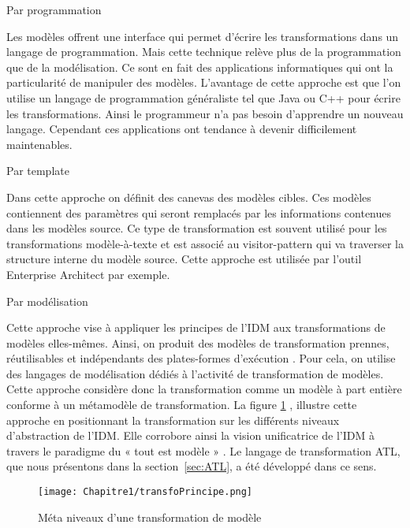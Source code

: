 \begin{bulletList}
\item Par programmation

Les modèles offrent une interface qui permet d'écrire les transformations dans un langage de programmation. Mais cette technique relève plus de la programmation que de la modélisation. Ce sont en fait des applications informatiques qui ont la particularité de manipuler des modèles. L'avantage de cette approche est que l'on utilise un langage de programmation généraliste tel que Java ou C++ pour écrire les transformations. Ainsi le programmeur n'a pas besoin d'apprendre un nouveau langage. Cependant ces applications ont tendance à devenir difficilement maintenables. 

\item Par template 

Dans cette approche on définit des canevas des modèles cibles. Ces modèles contiennent des paramètres qui seront remplacés par les informations contenues dans les modèles source. Ce type de transformation est souvent utilisé pour les transformations modèle-à-texte et est associé au visitor-pattern qui va traverser la structure interne du modèle source. Cette approche est utilisée par l'outil Enterprise Architect par exemple. 

\item Par modélisation

Cette approche vise à appliquer les principes de l'IDM aux transformations de modèles elles-mêmes. Ainsi, on produit des modèles de transformation prennes, réutilisables et indépendants des plates-formes d'exécution \cite{bezivin2006model}. Pour cela, on utilise des langages de modélisation dédiés à l'activité de transformation de modèles. Cette approche considère donc la transformation comme un modèle à part entière conforme à un métamodèle de transformation. La figure \ref{fig:TransfoPrincipe} , illustre cette approche en positionnant la transformation sur les différents niveaux d'abstraction de l'IDM. Elle corrobore ainsi la vision unificatrice de l'IDM à travers le paradigme du « tout est modèle » \cite{bezivin2005unification}. Le langage de transformation ATL, que nous présentons dans la section~\ref{sec:ATL}, a été développé dans ce sens. 

\end{bulletList}

\begin{figure}[!htbp]
 \begin{center}
  \texttt{[image: Chapitre1/transfoPrincipe.png]}
 \end{center}
 \caption{Méta niveaux d'une transformation de modèle}
 \label{fig:TransfoPrincipe}
\end{figure}

